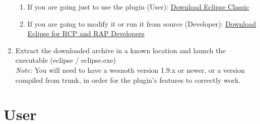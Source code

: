 \documentclass[10pt]{article}
\begin{document}
\begin{enumerate}
\begin{enumerate}
\item If you are going just to use the plugin (User): \href{http://eclipse.org/downloads/packages/eclipse-classic-360/heliosr}{Download Eclipse Classic}
\item If you are going to modify it or run it from source (Developer):  \href{http://eclipse.org/downloads/packages/eclipse-rcp-and-rap-developers/heliosr}{Download Eclipse for RCP and RAP Developers}
\end{enumerate}
\item Extract the downloaded archive in a known location and launch the executable (eclipse / eclipse.exe)\\
\textit{Note:} You will need to have a wesnoth version 1.9.x or newer, or a version compiled from trunk, in order for the plugin's features to correctly work.
\end{enumerate}

\section{User}
\end{document}
